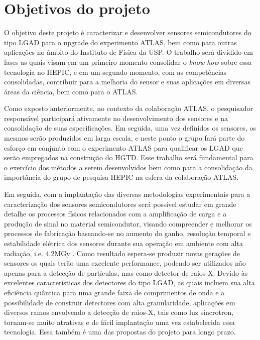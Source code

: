 \chapter{Objetivos do projeto}

O objetivo deste projeto é caracterizar e desenvolver sensores semicondutores do tipo LGAD para o upgrade do experimento ATLAS, bem como para outras aplicações no âmbito do Instituto de Física da USP. O trabalho será dividido em fases as quais visam em um primeiro momento consolidar o {\it know how} sobre essa tecnologia no HEPIC, e em um segundo momento, com as competências consolidadas, contribuir para a melhoria do sensor e suas aplicações em diversas áreas da ciência, bem como para o ATLAS.

Como exposto anteriormente, no contexto da colaboração ATLAS, o pesquisador responsável participará ativamente no desenvolvimento dos sensores e na consolidação de suas especificações. Em seguida, uma vez definidos os sensores, os mesmos serão produzidos em larga escala, e neste ponto o grupo fará parte do esforço em conjunto com o experimento ATLAS para qualificar os LGAD que serão empregados na construção do HGTD. Esse trabalho será fundamental para o exercício dos métodos a serem desenvolvidos bem como para a consolidação da importância do grupo de pesquisa HEPIC na esfera da colaboração ATLAS.

Em seguida, com a implantação das diversas metodologias experimentais para a caracterização dos sensores semicondutores será possível estudar em grande detalhe os processos físicos relacionados com a amplificação de carga e a produção de sinal no material semicondutor, visando compreender e melhorar os processos de fabricação baseando-se no aumento do ganho, resolução temporal e estabilidade elétrica dos sensores durante sua operação em ambiente com alta radiação, i.e. 4.2MGy \cite{tdr}. 
Como resultado espera-se produzir novas gerações de sensores os quais terão uma excelente performance, podendo ser utilizados não apenas para a detecção de partículas, mas como detector de raios-X. Devido às excelentes características dos detectores do tipo LGAD, as quais incluem sua alta eficiência quântica para uma grande faixa de comprimentos de onda e a possibilidade de construir detectores com alta granularidade, aplicações em diversos ramos envolvendo a detecção de raios-X, tais como luz síncrotron, tornam-se muito atrativas e de fácil implantação uma vez estabelecida essa tecnologia. Essa também é uma das propostas do projeto para longo prazo.

